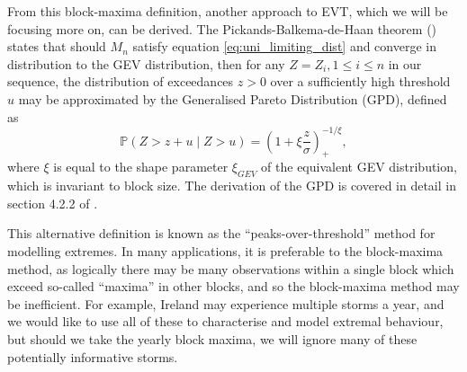 \documentclass{article}
\numberwithin{equation}{section}
\begin{document}
From this block-maxima definition, another approach to EVT, which we will be focusing more on, can be derived.
The Pickands-Balkema-de-Haan theorem (\cite{Pickands1975, Balkema1974}) states that should $M_n$ satisfy equation \eqref{eq:uni_limiting_dist} and converge in distribution to the GEV distribution, then for any $Z = Z_i, 1 \le i \le n$ in our sequence, the distribution of exceedances $z > 0$ over a sufficiently high threshold $u$ may be approximated by the Generalised Pareto Distribution (GPD), defined as
\begin{equation} \label{eq:gpd}
  \mathbb{P}(Z > z + u \mid Z > u) = \left(1 + \xi \frac{z}{\sigma} \right)_{+}^{-1/\xi},
\end{equation}
where $\xi$ is equal to the shape parameter $\xi_{GEV}$ of the equivalent GEV distribution, which is invariant to block size. %
The derivation of the GPD is covered in detail in section 4.2.2 of \citet{Coles2001}. 

This alternative definition is known as the ``peaks-over-threshold'' method for modelling extremes. 
In many applications, it is preferable to the block-maxima method, as logically there may be many observations within a single block which exceed so-called ``maxima'' in other blocks, and so the block-maxima method may be inefficient.
For example, Ireland may experience multiple storms a year, and we would like to use all of these to characterise and model extremal behaviour, but should we take the yearly block maxima, we will ignore many of these potentially informative storms.
\end{document}
